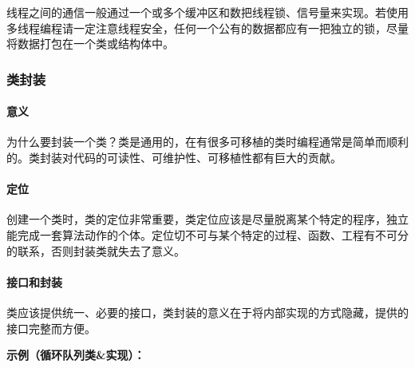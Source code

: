\documentclass[
]{article}
\begin{document}
线程之间的通信一般通过一个或多个缓冲区和数把线程锁、信号量来实现。若使用多线程编程请一定注意线程安全，任何一个公有的数据都应有一把独立的锁，尽量将数据打包在一个类或结构体中。

\hypertarget{ux7c7bux5c01ux88c5}{%
\subsubsection{类封装}\label{ux7c7bux5c01ux88c5}}

\hypertarget{ux610fux4e49}{%
\paragraph{意义}\label{ux610fux4e49}}

为什么要封装一个类？类是通用的，在有很多可移植的类时编程通常是简单而顺利的。类封装对代码的可读性、可维护性、可移植性都有巨大的贡献。

\hypertarget{ux5b9aux4f4d}{%
\paragraph{定位}\label{ux5b9aux4f4d}}

创建一个类时，类的定位非常重要，类定位应该是尽量脱离某个特定的程序，独立能完成一套算法动作的个体。定位切不可与某个特定的过程、函数、工程有不可分的联系，否则封装类就失去了意义。

\hypertarget{ux63a5ux53e3ux548cux5c01ux88c5}{%
\paragraph{接口和封装}\label{ux63a5ux53e3ux548cux5c01ux88c5}}

类应该提供统一、必要的接口，类封装的意义在于将内部实现的方式隐藏，提供的接口完整而方便。

\textbf{示例（循环队列类\&实现）：}
\end{document}
